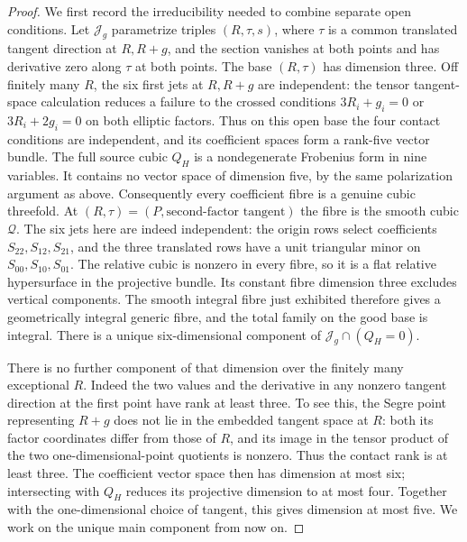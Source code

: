 \begin{proof}
We first record the irreducibility needed to combine separate open
conditions. Let $\mathcal J_g$ parametrize triples $(R,\tau,s)$,
where $\tau$ is a common translated tangent direction at $R,R+g$,
and the section vanishes at both points and has derivative zero
along $\tau$ at both points. The base $(R,\tau)$ has dimension
three. Off finitely many $R$, the six first jets at $R,R+g$ are
independent: the tensor tangent-space calculation reduces a failure
to the crossed conditions
$3R_i+g_i=0$ or $3R_i+2g_i=0$ on both elliptic factors.
Thus on this open base the four contact conditions are independent,
and its coefficient spaces form a rank-five vector bundle.
The full source cubic $Q_H$ is a nondegenerate Frobenius form in
nine variables. It contains no vector space of dimension five,
by the same polarization argument as above. Consequently every
coefficient fibre is a genuine cubic threefold.
At $(R,\tau)=(P,\text{second-factor tangent})$ the fibre is the
smooth cubic $\mathcal Q$. The six jets here are indeed independent:
the origin rows select coefficients $S_{22},S_{12},S_{21}$, and
the three translated rows have a unit triangular minor on
$S_{00},S_{10},S_{01}$.
The relative cubic is nonzero in every fibre, so it is a flat
relative hypersurface in the projective bundle. Its constant fibre
dimension three excludes vertical components. The smooth integral
fibre just exhibited therefore gives a geometrically integral
generic fibre, and the total family on the good base is integral.
There is a unique six-dimensional component of
$\mathcal J_g\cap(Q_H=0)$.

There is no further component of that dimension over the finitely
many exceptional $R$. Indeed the two values and the derivative in
any nonzero tangent direction at the first point have rank at
least three. To see this, the Segre point representing $R+g$
does not lie in the embedded tangent space at $R$: both its factor
coordinates differ from those of $R$, and its image in the tensor
product of the two one-dimensional-point quotients is nonzero.
Thus the contact rank is at least three. The coefficient vector
space then has dimension at most six; intersecting with $Q_H$
reduces its projective dimension to at most four. Together with
the one-dimensional choice of tangent, this gives dimension at
most five. We work on the unique main component from now on.


\end{proof}
